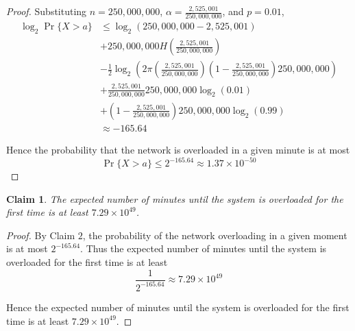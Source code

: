 \documentclass{article}
\newtheorem{claim}{Claim}
\begin{document}
\begin{proof}
    Substituting $n = 250{,}000{,}000$, $\alpha = \frac{2{,}525{,}001}{250{,}000{,}000}$, and $p = 0.01$,
    \[
    \begin{aligned}
    \log_2\Pr\{X > a\} &\leq \log_2\left(250{,}000{,}000-2{,}525{,}001\right) \\
    &+250{,}000{,}000H\left(\frac{2{,}525{,}001}{250{,}000{,}000}\right) \\
    &-\frac{1}{2}\log_2\left(2\pi\left(\frac{2{,}525{,}001}{250{,}000{,}000}\right)
    \left(1-\frac{2{,}525{,}001}{250{,}000{,}000}\right)250{,}000{,}000\right) \\
    &+\frac{2{,}525{,}001}{250{,}000{,}000}250{,}000{,}000\log_2(0.01) \\
    &+ \left(1-\frac{2{,}525{,}001}{250{,}000{,}000}\right)250{,}000{,}000\log_2(0.99) \\
    &\approx -165.64
    \end{aligned}
    \]

    \medskip

    Hence the probability that the network is overloaded in a given minute is at most
    \[
    \Pr\{X > a\} \leq 2^{-165.64} \approx 1.37 \times 10^{-50}
    \]
\end{proof}

\begin{claim}
    The expected number of minutes until the system is overloaded for the first time is at least 
    $7.29 \times 10^{49}$.
\end{claim}

\begin{proof}
    By Claim $2$, the probability of the network overloading in a given moment is at most $2^{-165.64}$. 
    Thus the expected number of minutes until the system is overloaded for the first time is at least
    \[
    \frac{1}{2^{-165.64}} \approx 7.29 \times 10^{49}
    \]

    \medskip

    Hence the expected number of minutes until the system is overloaded for the first time is at least
    $7.29 \times 10^{49}$.
\end{proof}
\end{document}
